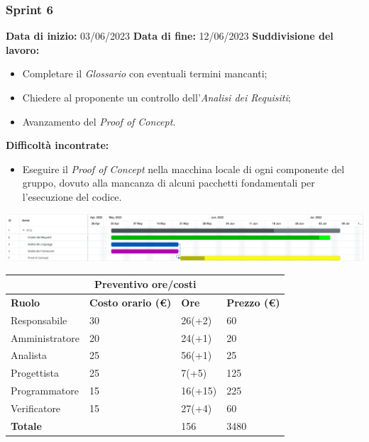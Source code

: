 \documentclass[a4paper, 12pt]{article}
\begin{document}
\newpage

\subsubsection{Sprint 6}
\textbf{Data di inizio:} 03/06/2023\newline
\textbf{Data di fine:} 12/06/2023\newline
\newline
\textbf{Suddivisione del lavoro:}
\begin{itemize}
    \item Completare il \textit{Glossario} con eventuali termini mancanti;
    \item Chiedere al proponente un controllo dell'\textit{Analisi dei Requisiti};
    \item Avanzamento del \textit{Proof of Concept}.
\end{itemize}
\textbf{Difficoltà incontrate:}
\begin{itemize}
    \item Eseguire il \textit{Proof of Concept} nella macchina locale di ogni componente del gruppo, dovuto alla mancanza di alcuni pacchetti fondamentali per l'esecuzione del codice.
\end{itemize}
\includegraphics[scale=0.24]{RTB_5.png}\newline
\newline

\begin{center}
	\begin{tabularx}{\textwidth}{|X|X|X|X|}
		\hline
		\multicolumn{4}{|c|}{\textbf{Preventivo ore/costi}}                                      \\
		\hline
		\hline
		\textbf{Ruolo}  & \textbf{Costo orario (\euro)} & \textbf{Ore} & \textbf{Prezzo (\euro)} \\
		\hline
		Responsabile    & 30                            & 26(+2)       & 60                      \\
		\hline
		Amministratore  & 20                            & 24(+1)       & 20                       \\
		\hline
		Analista        & 25                            & 56(+1)       & 25                       \\
		\hline
		Progettista     & 25                            & 7(+5)       & 125                     \\
		\hline
		Programmatore   & 15                            & 16(+15)      & 225                     \\
		\hline
		Verificatore    & 15                            & 27(+4)       & 60                      \\
		\hline
		\hline
		\textbf{Totale} &                               & 156          & 3480                    \\
		\hline
	\end{tabularx}\\[8pt]
	\mbox{}\\
\end{center}
\end{document}
